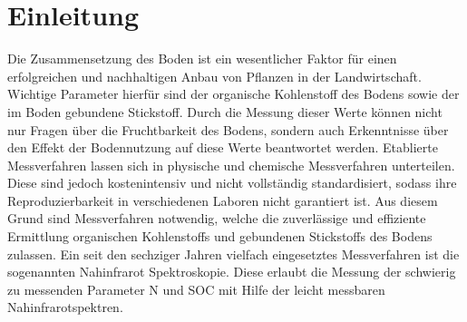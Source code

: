 \section{Einleitung}
\label{sec:Einleitung}

    Die Zusammensetzung des Boden ist ein wesentlicher Faktor für einen erfolgreichen und nachhaltigen Anbau von Pflanzen in der Landwirtschaft.
    Wichtige Parameter hierfür sind der organische Kohlenstoff des Bodens sowie der im Boden gebundene Stickstoff. Durch die Messung dieser Werte können nicht nur Fragen über die Fruchtbarkeit des Bodens, sondern auch Erkenntnisse über den Effekt der Bodennutzung auf diese Werte beantwortet werden.\cite{Poeplau2013}
    Etablierte Messverfahren lassen sich in physische und chemische Messverfahren unterteilen. Diese sind jedoch kostenintensiv und   nicht vollständig standardisiert, sodass ihre Reproduzierbarkeit in verschiedenen Laboren nicht garantiert ist.
    Aus diesem Grund sind Messverfahren notwendig, welche die zuverlässige und effiziente Ermittlung organischen Kohlenstoffs und gebundenen Stickstoffs des Bodens zulassen.
    Ein seit den sechziger Jahren vielfach eingesetztes Messverfahren ist die sogenannten Nahinfrarot Spektroskopie. \cite{Agelet2010}
    Diese erlaubt die Messung der schwierig zu messenden Parameter N und SOC mit Hilfe der leicht messbaren Nahinfrarotspektren.

	
